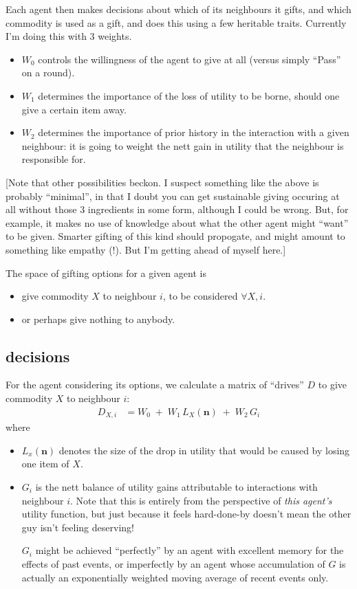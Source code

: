 \documentclass[11pt]{article}
\begin{document}
Each agent then makes decisions about which of its neighbours it
gifts, and which commodity is used as a gift, and does this using a
few heritable traits. Currently I'm doing this with 3 weights.
\begin{itemize}
\item $W_0$ controls the willingness of the agent to give at all (versus simply ``Pass'' on a round).
\item $W_1$ determines the importance of the loss of utility to be borne, should one give a certain item away.
\item $W_2$ determines the importance of prior history in the interaction with a given neighbour: it is going to weight the nett gain in utility that the neighbour is responsible for.
\end{itemize}

[Note that other possibilities beckon. I suspect something like the
above is probably ``minimal'', in that I doubt you can get sustainable
giving occuring at all without those 3 ingredients in some form,
although I could be wrong. But, for example, it makes no use of
knowledge about what the other agent might ``want'' to be
given. Smarter gifting of this kind should propogate, and might amount to
something like empathy (!). But I'm getting ahead of myself here.]


The space of gifting options for a given agent is 
\begin{itemize}
\item give commodity $X$ to neighbour $i$, to be considered $\forall X, i$.
\item or perhaps give nothing to anybody.
\end{itemize}

\subsection{decisions}
For the agent considering its options, 
we calculate a matrix of ``drives'' $D$ to give commodity $X$ to neighbour $i$:
\begin{align*}
D_{X,i} &= W_{0} \; + \; W_{1} \, L_{X}(\mathbf{n}) \; + \; W_{2} \, G_{i}
\end{align*}
where 
\begin{itemize}
\item $L_{x}(\mathbf{n})$ denotes the size of the drop in utility that would be caused by losing one item of $X$.
\item $G_{i}$ is the nett balance of utility gains attributable to interactions with neighbour $i$. Note that this is entirely from the perspective of {\it this agent's} utility function, but just because it feels hard-done-by doesn't mean the other guy isn't feeling deserving!

  $G_{i}$ might be achieved ``perfectly'' by an agent with excellent
  memory for the effects of past events, or imperfectly by an agent
  whose accumulation of $G$ is actually an exponentially weighted
  moving average of recent events only.
\end{itemize}
\end{document}
